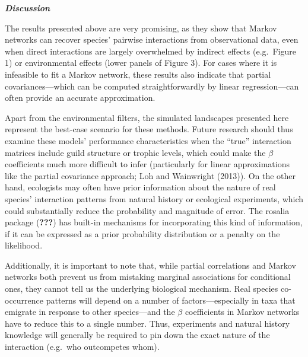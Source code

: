 \documentclass[12pt,]{article}
\begin{document}
\begin{spacing}{1.9}
\begin{flushleft}
\textbf{\emph{Discussion}}

The results presented above are very promising, as they show that Markov
networks can recover species' pairwise interactions from observational
data, even when direct interactions are largely overwhelmed by indirect
effects (e.g.~Figure 1) or environmental effects (lower panels of Figure
3). For cases where it is infeasible to fit a Markov network, these
results also indicate that partial covariances---which can be computed
straightforwardly by linear regression---can often provide an accurate
approximation.

Apart from the environmental filters, the simulated landscapes presented
here represent the best-case scenario for these methods. Future research
should thus examine these models' performance characteristics when the
``true'' interaction matrices include guild structure or trophic levels,
which could make the \(\beta\) coefficients much more difficult to infer
(particularly for linear approximations like the partial covariance
approach; Loh and Wainwright (2013)). On the other hand, ecologists may
often have prior information about the nature of real species'
interaction patterns from natural history or ecological experiments,
which could substantially reduce the probability and magnitude of error.
The rosalia package ({\textbf{???}}) has built-in mechanisms for
incorporating this kind of information, if it can be expressed as a
prior probability distribution or a penalty on the likelihood.

Additionally, it is important to note that, while partial correlations
and Markov networks both prevent us from mistaking marginal associations
for conditional ones, they cannot tell us the underlying biological
mechanism. Real species co-occurrence patterns will depend on a number
of factors---especially in taxa that emigrate in response to other
species---and the \(\beta\) coefficients in Markov networks have to
reduce this to a single number. Thus, experiments and natural history
knowledge will generally be required to pin down the exact nature of the
interaction (e.g.~who outcompetes whom).


\end{flushleft}
\end{spacing}
\end{document}
